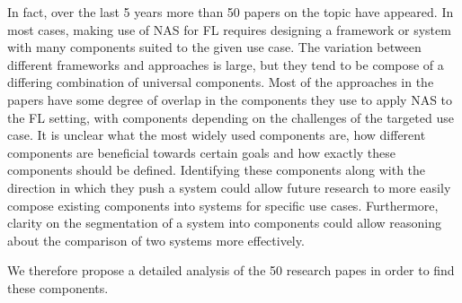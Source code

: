 In fact, over the last 5 years more than 50 papers on the topic have appeared. In most cases, making use of NAS for FL requires designing a framework or system with many components suited to the given use case. The variation between different frameworks and approaches is large, but they tend to be compose of a differing combination of universal components. Most of the approaches in the papers have some degree of overlap in the components they use to apply NAS to the FL setting, with components depending on the challenges of the targeted use case. 
It is unclear what the most widely used components are, how different components are beneficial towards certain goals and how exactly these components should be defined. Identifying these components along with the direction in which they push a system could allow future research to more easily compose existing components into systems for specific use cases. Furthermore, clarity on the segmentation of a system into components could allow reasoning about the comparison of two systems more effectively.

We therefore propose a detailed analysis of the 50 research papes in order to find these components.

